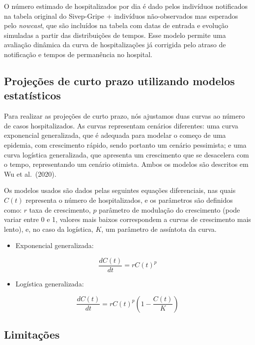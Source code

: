 \documentclass[
]{article}
\providecommand{\tightlist}{%
  \setlength{\itemsep}{0pt}\setlength{\parskip}{0pt}}
\begin{document}
O número estimado de hospitalizados por dia é dado pelos indivíduos
notificados na tabela original do Sivep-Gripe + indivíduos
não-observados mas esperados pelo \emph{nowcast}, que são incluídos na
tabela com datas de entrada e evolução simuladas a partir das
distribuições de tempos. Esse modelo permite uma avaliação dinâmica da
curva de hospitalizações já corrigida pelo atraso de notificação e
tempos de permanência no hospital.

\hypertarget{projeuxe7uxf5es-de-curto-prazo-utilizando-modelos-estatuxedsticos}{%
\subsection{Projeções de curto prazo utilizando modelos
estatísticos}\label{projeuxe7uxf5es-de-curto-prazo-utilizando-modelos-estatuxedsticos}}

Para realizar as projeções de curto prazo, nós ajustamos duas curvas ao
número de casos hospitalizados. As curvas representam cenários
diferentes: uma curva exponencial generalizada, que é adequada para
modelar o começo de uma epidemia, com crescimento rápido, sendo portanto
um cenário pessimista; e uma curva logística generalizada, que apresenta
um crescimento que se desacelera com o tempo, representando um cenário
otimista. Ambos os modelos são descritos em Wu et al.~(2020).

Os modelos usados são dados pelas seguintes equações diferenciais, nas
quais \(C(t)\) representa o número de hospitalizados, e os parâmetros
são definidos como: \(r\) taxa de crescimento, \(p\) parâmetro de
modulação do crescimento (pode variar entre 0 e 1, valores mais baixos
correspondem a curvas de crescimento mais lento), e, no caso da
logística, \(K\), um parâmetro de assíntota da curva.

\begin{itemize}
\tightlist
\item
  Exponencial generalizada:
\end{itemize}

\[
\frac{dC(t)}{dt} = rC(t)^p 
\]

\begin{itemize}
\tightlist
\item
  Logística generalizada:
\end{itemize}

\[
\frac{dC(t)}{dt} = rC(t)^p \left (1-\frac{C(t)}{K} \right) 
\]

\hypertarget{limitauxe7uxf5es}{%
\subsection{Limitações}\label{limitauxe7uxf5es}}
\end{document}
